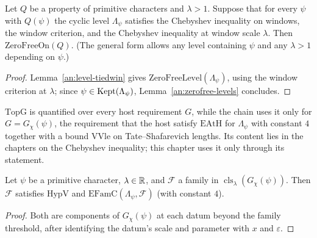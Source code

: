 \begin{proposition}\label{an:zerofree-tiedwin}
Let $Q$ be a property of primitive characters and $\lambda>1$. Suppose
that for every $\psi$ with $Q(\psi)$ the cyclic level $\Lambda_{\psi}$
satisfies the Chebyshev inequality on windows, the window criterion, and
the Chebyshev inequality at window scale $\lambda$. Then
$\mathrm{ZeroFreeOn}(Q)$. (The general form allows any level containing
$\psi$ and any $\lambda>1$ depending on $\psi$.)
\end{proposition}
\begin{proof}
Lemma~\ref{an:level-tiedwin} gives $\mathrm{ZeroFreeLevel}(\Lambda_{\psi})$,
using the window criterion at $\lambda$; since
$\psi\in\operatorname{Kept}(\Lambda_{\psi})$, Lemma~\ref{an:zerofree-levels} concludes.
\end{proof}



\begin{remark}
$\mathrm{TopG}$ is quantified over every host requirement $G$, while the
chain uses it only for $G=G_{\chi}(\psi)$, the requirement that the host
satisfy $\mathrm{EAtH}$ for $\Lambda_{\psi}$ with constant $4$ together with
a bound $\mathrm{VVle}$ on Tate--Shafarevich lengths. Its content lies in
the chapters on the Chebyshev inequality; this chapter uses it only
through its statement.
\end{remark}

\begin{lemma}\label{an:cls}
Let $\psi$ be a primitive character, $\lambda\in\mathbb{R}$, and $\mathcal F$ a
family in $\operatorname{cls}_{\lambda}(G_{\chi}(\psi))$. Then $\mathcal F$
satisfies $\mathrm{HypV}$ and $\mathrm{EFamC}(\Lambda_{\psi},\mathcal F)$
(with constant $4$).
\end{lemma}
\begin{proof}
Both are components of $G_{\chi}(\psi)$ at each datum beyond the family
threshold, after identifying the datum's scale and parameter with $x$ and
$\varepsilon$.
\end{proof}

